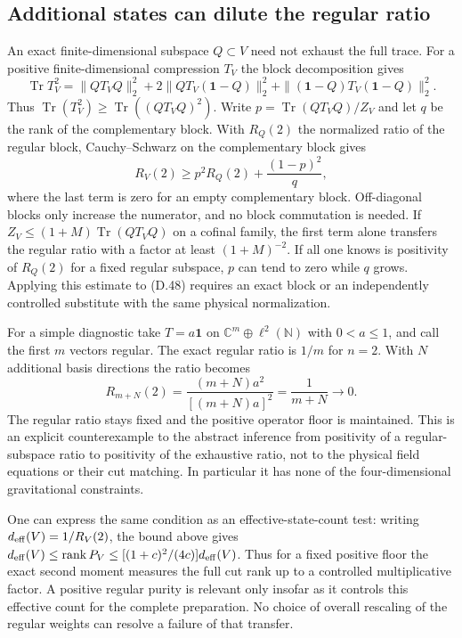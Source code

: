 \documentclass[11pt]{article}
\newcommand{\Tr}{\operatorname{Tr}}
\newcommand{\id}{\mathbf{1}}
\DeclareMathOperator{\rank}{rank}
\begin{document}
\subsection{Additional states can dilute the regular ratio}
An exact finite-dimensional subspace $Q\subset V$ need not exhaust the full trace. For a positive finite-dimensional compression $T_V$ the block decomposition gives
\[
 \Tr T_V^2=\|QT_VQ\|_2^2+2\|QT_V(\id-Q)\|_2^2
       +\|(\id-Q)T_V(\id-Q)\|_2^2.
\]
Thus $\Tr(T_V^2)\ge \Tr((QT_VQ)^2)$. Write $p=\Tr(QT_VQ)/Z_V$ and let $q$ be the rank of the complementary block. With $R_Q(2)$ the normalized ratio of the regular block, Cauchy--Schwarz on the complementary block gives
\begin{equation}\label{eq:replica-complement}
 R_V(2)\ge p^2R_Q(2)+\frac{(1-p)^2}{q},
\end{equation}
where the last term is zero for an empty complementary block. Off-diagonal blocks only increase the numerator, and no block commutation is needed. If $Z_V\le(1+M)\Tr(QT_VQ)$ on a cofinal family, the first term alone transfers the regular ratio with a factor at least $(1+M)^{-2}$. If all one knows is positivity of $R_Q(2)$ for a fixed regular subspace, $p$ can tend to zero while $q$ grows. Applying this estimate to (D.48) requires an exact block or an independently controlled substitute with the same physical normalization.

For a simple diagnostic take $T=a\id$ on $\mathbb C^m\oplus\ell^2(\mathbb N)$ with $0<a\le1$, and call the first $m$ vectors regular. The exact regular ratio is $1/m$ for $n=2$. With $N$ additional basis directions the ratio becomes
\[
 R_{m+N}(2)=\frac{(m+N)a^2}{[(m+N)a]^2}=\frac{1}{m+N}\longrightarrow 0.
\]
The regular ratio stays fixed and the positive operator floor is maintained. This is an explicit counterexample to the abstract inference from positivity of a regular-subspace ratio to positivity of the exhaustive ratio, not to the physical field equations or their cut matching. In particular it has none of the four-dimensional gravitational constraints.

One can express the same condition as an effective-state-count test: writing $d_{\rm eff}(V)=1/R_V(2)$, the bound above gives $d_{\rm eff}(V)\le\rank P_V\le [(1+c)^2/(4c)]d_{\rm eff}(V)$. Thus for a fixed positive floor the exact second moment measures the full cut rank up to a controlled multiplicative factor. A positive regular purity is relevant only insofar as it controls this effective count for the complete preparation. No choice of overall rescaling of the regular weights can resolve a failure of that transfer.
\end{document}
